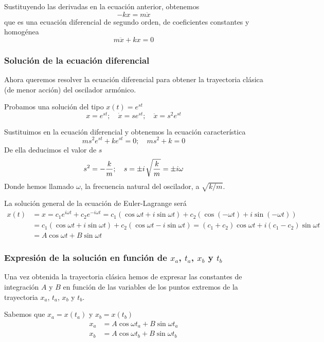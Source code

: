 Sustituyendo las derivadas en la ecuación anterior, obtenemos
\[
  -kx = m\ddot{x}
\]
que es una ecuación diferencial de segundo orden, de coeficientes
constantes y homogénea
\[
  m\ddot{x}+kx = 0
\]

\subsubsection{Solución de la ecuación diferencial}
Ahora queremos resolver la ecuación diferencial para obtener la
trayectoria clásica (de menor acción) del oscilador armónico.

Probamos una solución del tipo $x(t)=e^{st}$
\[
  x = e^{st}
  ;\hspace{1em}
  \dot{x} = se^{st}
  ;\hspace{1em}
  \ddot{x} = s^2e^{st}
\]

Sustituimos en la ecuación diferencial y obtenemos la ecuación característica
\[
  m s^2e^{st} + ke^{st} = 0
  ;\hspace{1em}
  ms^2 + k = 0
\]
De ella deducimos el valor de $s$
\[
  s^2 = -\dfrac{k}{m}
  ;\hspace{1em}
  s = \pm i\kern1pt\sqrt{\dfrac{k}{m}}
  = \pm i\omega
\]
Donde hemos llamado $\omega$, la frecuencia natural del oscilador, a $\sqrt{k/m}$.

La solución general de la ecuación de Euler-Lagrange será
\begin{align*}
  x(t)
  &= x = c_1 e^{i\omega t} + c_2 e^{-i\omega t}
  = c_1(\cos\omega t + i\sin\omega t) + c_2(\cos(-\omega t) + i\sin(-\omega t))\\
  &=
    c_1(\cos\omega t + i\sin\omega t) + c_2(\cos\omega t - i\sin\omega t)
    = (c_1+c_2) \cos\omega t + i (c_1-c_2) \sin\omega t\\
    &= A \cos\omega t + B\sin\omega t
\end{align*}

\subsubsection{Expresión de la solución en función de $x_a$, $t_a$,
  $x_b$ y $t_b$}
Una vez obtenida la trayectoria clásica hemos de expresar las
constantes de integración $A$ y $B$ en función de las variables de los puntos extremos de la trayectoria $x_a$, $t_a$, $x_b$ y $t_b$.

Sabemos que $x_a=x(t_a)$ y $x_b=x(t_b)$
\begin{align*}
  x_a &= A\cos\omega t_a + B\sin\omega t_a\\
  x_b &= A\cos\omega t_b + B\sin\omega t_b
\end{align*}

